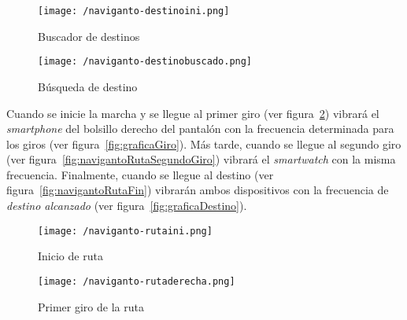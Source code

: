 \begin{figure}[!h]
  \begin{minipage}[b]{0.5\linewidth}
    \begin{center}
      \texttt{[image: /naviganto-destinoini.png]}
      \caption{Buscador de destinos}
      \label{fig:navigantoDestinoIni}
    \end{center}
  \end{minipage}
  \begin{minipage}[b]{0.5\linewidth}
    \begin{center}
      \texttt{[image: /naviganto-destinobuscado.png]}
      \caption{Búsqueda de destino}
      \label{fig:navigantoDestinoBuscado}
    \end{center}
  \end{minipage}
\end{figure}

Cuando se inicie la marcha y se llegue al primer giro (ver figura~\ref{fig:navigantoRutaPrimerGiro})
vibrará el \emph{smartphone} del bolsillo derecho del pantalón con la frecuencia determinada para
los giros (ver figura~\ref{fig:graficaGiro}). Más tarde, cuando se llegue al segundo giro (ver
figura~\ref{fig:navigantoRutaSegundoGiro}) vibrará el \emph{smartwatch} con la misma
frecuencia. Finalmente, cuando se llegue al destino (ver figura~\ref{fig:navigantoRutaFin}) vibrarán
ambos dispositivos con la frecuencia de \emph{destino alcanzado} (ver
figura~\ref{fig:graficaDestino}).

\begin{figure}[!h]
  \begin{minipage}[b]{0.5\linewidth}
    \begin{center}
      \texttt{[image: /naviganto-rutaini.png]}
      \caption{Inicio de ruta}
      \label{fig:navigantoRutaIni}
    \end{center}
  \end{minipage}
  \begin{minipage}[b]{0.5\linewidth}
    \begin{center}
      \texttt{[image: /naviganto-rutaderecha.png]}
      \caption{Primer giro de la ruta}
      \label{fig:navigantoRutaPrimerGiro}
    \end{center}
  \end{minipage}
\end{figure}

